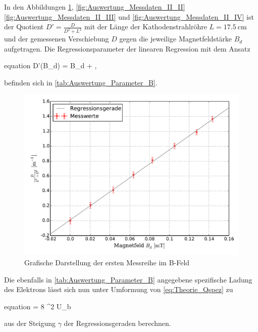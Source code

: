 		
		
		
		In den Abbildungen \ref{fig:Auswertung_Messdaten_II_I}, \ref{fig:Auswertung_Messdaten_II_II}
		\ref{fig:Auswertung_Messdaten_II_III} und \ref{fig:Auswertung_Messdaten_II_IV}
		ist der Quotient $D'=\frac{D}{D^{2} + L^{2}}$ mit der Länge der Kathodenstrahlröhre 
		$L = \SI{17.5}{\centi\meter}$ und der gemessenen Verschiebung $D$ gegen die
		jeweilige Magnetfeldstärke $B_{d}$ aufgetragen.
		Die Regressionsparameter der linearen Regression mit dem Ansatz
		\begin{empheq}{equation}
			D'(B_{d}) = \gamma \cdot B_{d} + \delta,
		\end{empheq} 
		befinden sich in \cref{tab:Auswertung_Parameter_B}.
		
		
		
		\begin{figure}[!h]
				\includegraphics[scale=0.7]{Grafiken/BFeld_Messreihe_I.pdf}
				\caption{Grafische Darstellung der ersten Messreihe im B-Feld}\label{fig:Auswertung_Messdaten_II_I}
		\end{figure}
		
		
		
		Die ebenfalls in \cref{tab:Auswertung_Parameter_B} angegebene spezifische Ladung des Elektrons lässt sich nun unter Umformung von \cref{eq:Theorie_Qspez} zu 
		\begin{empheq}{equation} 
			 = 8 \cdot \gamma^{2} \cdot U_{b}  
		\end{empheq}	
		aus der Steigung $\gamma$ der Regressionsgeraden berechnen.
		

